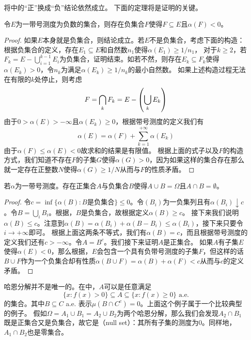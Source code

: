 \documentclass[main.tex]{subfiles}
\begin{document}
将中的``正''换成``负''结论依然成立。
下面的定理将是证明的关键。
\begin{lemma} \label{lem:a.4.4}
	令\(E\)为一带号测度为负数的集合，则存在负集合\(F\)使得\(F\subseteq E\)且\(\alpha(F)<0\)。
\end{lemma}
\begin{proof}
	如果\(E\)本身就是负集合，则结论成立。若\(E\)不是负集合，考虑下面的构造：根据负集合的定义，存在\(E_1\subseteq E\)和自然数\(n_1\)使得\(\alpha(E_1) \geq 1/n_1\)，
	对于\(k\geq 2\)，若\(F_k = E-\bigcup_{i=1}^{k-1}E_i\)为负集合，证明结束。如若不然，则存在\(E_k\subseteq F_k\)使得\(\alpha(E_k) > 0\)，令\(n_k\)为满足\(\alpha(E_k) \geq 1/n_k\)的最小自然数。
	如果上述构造过程无法在有限的\(k\)处停止，则考虑
	\[F=\bigcap_k F_k = E-\del{\bigcup_k E_k}\]
	由于\(0>\alpha(E)>-\infty\)且\(\alpha(E_k)\geq 0\)，根据带号测度的定义我们有
	\[\alpha(E) = \alpha(F)+\sum_{k=1}^{+\infty}\alpha(E_k)\]
	由于\(\alpha(F)\leq \alpha(E)< 0\)故求和的结果是有限值。
	根据上面的式子以及\(F\)的构造方式，我们知道不存在\(F\)的子集\(G\)使得\(\alpha(G) > 0\)，因为如果这样的集合存在那么就一定存在正整数\(N\)使得\(\alpha(G)\geq 1/N\)从而与\(F\)的性质矛盾。
\end{proof}

\begin{theorem}
	\label{thm:a.4.5}
	若\(\alpha\)为一带号测度。存在正集合\(A\)与负集合\(B\)使得\(A\cup B=\Omega\)且\(A\cap B = \emptyset\)。
\end{theorem}
\begin{proof}
	令\(c=\inf\{\alpha(B): B\text{是负集合}\}\leq 0\)。令\((B_i)\)为一负集列且有\(\alpha(B_i) \downarrow c\)。令\(B = \bigcup_i B_i\)。根据，\(B\)是负集合，故根据定义\(\alpha(B) \geq c\)。
	接下来我们说明\(\alpha(B)\leq c\)。注意到\(\alpha(B) = \alpha(B_i)+\alpha(B-B_i) \leq \alpha(B_i)\)，接下来只要令\(i\rightarrow +\infty\)即可。
	根据上面这两条不等式，我们有\(\alpha(B)=c\)，而且根据带号测度的定义我们还有\(c>-\infty\)。令\(A=B^c\)。我们接下来证明\(A\)是正集合。
	如果\(A\)有子集\(E\)使得\(\alpha(E)<0\)，那么根据，\(E\)会包含一个具有负带号测度的子集\(F\)，但这样的话\(B\cup F\)作为一个负集合却有性质\(\alpha(B\cup F) = \alpha(B)+\alpha(F) < c\)从而与\(c\)的定义矛盾。
\end{proof}

哈恩分解并不是唯一的。在中，\(A\)可以是任意满足
\[\{x: f(x)>0\}\subseteq A\subseteq \{x: f(x)\geq 0\} \text{ a.e.}\]
的集合。其中\(B\subseteq C\) a.e. 表示\(\mu(B\cap C^c)=0\)。上面这个例子属于一个比较典型的例子。
假如\(\Omega = A_1\cup B_1=A_2\cup B_2\)为两个哈恩分解，那么我们会发现\(A_2\cap B_1\)既是正集合又是负集合，故它是（null set）：其所有子集的测度为\(0\)。同样地，\(A_1\cap B_2\)也是零集合。
\end{document}
